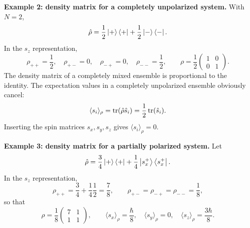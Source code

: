 \textbf{Example 2: density matrix for a completely unpolarized system.} With $N=2$,
\begin{equation}
\hat{\rho}=\frac12\left|+\right\rangle\left\langle+\right|+\frac12\left|-\right\rangle\left\langle-\right|.
\end{equation}
In the $s_z$ representation,
\begin{equation}
\rho_{++}=\frac12,\quad\rho_{+-}=0,\quad\rho_{-+}=0,\quad\rho_{--}=\frac12,\qquad
\rho=\frac12\begin{pmatrix}1&0\\0&1\end{pmatrix}.
\end{equation}
The density matrix of a completely mixed ensemble is proportional to the identity. The expectation values in a completely unpolarized ensemble obviously cancel:
\begin{equation}
\langle s_i\rangle_\rho=\operatorname{tr}(\hat{\rho}\hat{s}_i)=\frac12\operatorname{tr}(\hat{s}_i).
\end{equation}
Inserting the spin matrices $s_x,s_y,s_z$ gives $\langle s_i\rangle_\rho=0$.

\textbf{Example 3: density matrix for a partially polarized system.} Let
\begin{equation}
\hat{\rho}=\frac34\left|+\right\rangle\left\langle+\right|+\frac14\left|s_x^+\right\rangle\left\langle s_x^+\right|.
\end{equation}
In the $s_z$ representation,
\begin{equation}
\rho_{++}=\frac34+\frac14\frac12=\frac78,\qquad
\rho_{+-}=\rho_{-+}=\rho_{--}=\frac18,
\end{equation}
so that
\begin{equation}
\rho=\frac18\begin{pmatrix}7&1\\1&1\end{pmatrix},\qquad
\langle s_x\rangle_\rho=\frac\hbar8,\quad\langle s_y\rangle_\rho=0,\quad\langle s_z\rangle_\rho=\frac{3\hbar}{8}.
\end{equation}



